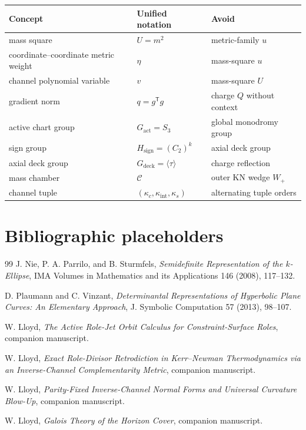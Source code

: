 \documentclass[11pt]{article}
\theoremstyle{remark}
\newcommand{\kc}{\kappa_c}
\newcommand{\ks}{\kappa_s}
\newcommand{\kint}{\kappa_{\mathrm{int}}}
\newcommand{\Cham}{\mathcal C}
\newcommand{\Wp}{W_+}
\begin{document}
\begin{center}
\begin{tabular}{lll}
\toprule
Concept & Unified notation & Avoid\\
\midrule
mass square & $U=m^2$ & metric-family $u$\\
coordinate--coordinate metric weight & $\eta$ & mass-square $u$\\
channel polynomial variable & $v$ & mass-square $U$\\
gradient norm & $q=g^{\mathsf T}g$ & charge $Q$ without context\\
active chart group & $G_{\mathrm{act}}=S_3$ & global monodromy group\\
sign group & $H_{\mathrm{sign}}=(C_2)^k$ & axial deck group\\
axial deck group & $G_{\mathrm{deck}}=\langle\tau\rangle$ & charge reflection\\
mass chamber & $\Cham$ & outer KN wedge $\Wp$\\
channel tuple & $(\kc,\kint,\ks)$ & alternating tuple orders\\
\bottomrule
\end{tabular}
\end{center}

\section{Bibliographic placeholders}

\begin{thebibliography}{99}
J. Nie, P. A. Parrilo, and B. Sturmfels,
\emph{Semidefinite Representation of the $k$-Ellipse},
IMA Volumes in Mathematics and its Applications 146 (2008), 117--132.

D. Plaumann and C. Vinzant,
\emph{Determinantal Representations of Hyperbolic Plane Curves:
An Elementary Approach},
J. Symbolic Computation 57 (2013), 98--107.

W. Lloyd,
\emph{The Active Role-Jet Orbit Calculus for Constraint-Surface Roles},
companion manuscript.

W. Lloyd,
\emph{Exact Role-Divisor Retrodiction in Kerr--Newman Thermodynamics
via an Inverse-Channel Complementarity Metric},
companion manuscript.

W. Lloyd,
\emph{Parity-Fixed Inverse-Channel Normal Forms and Universal Curvature
Blow-Up},
companion manuscript.

W. Lloyd,
\emph{Galois Theory of the Horizon Cover},
companion manuscript.
\end{thebibliography}
\end{document}
